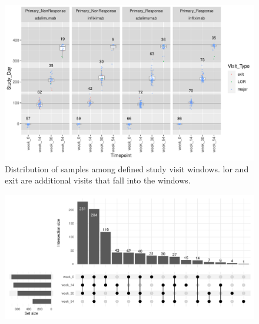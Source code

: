 \begin{outline}
\begin{figure}
    \centering
    \includegraphics[width=1.0\textwidth,page=1]{mainmatter/figures/chapter_04/process_pheno.pheno_filtered_dge.Study_Day_vs_Visit_Label.pdf}
    \caption{Distribution of samples among defined study visit windows. lor and exit are additional visits that fall into the windows.}
    \label{fig:multipants_studyDay_boxplots}
\end{figure}

\begin{figure}
    \centering
    \includegraphics[width=1.0\textwidth,page=1]{mainmatter/figures/chapter_04/process_pheno.pheno_filtered_dge.Visit_Label_upset.pdf}
    \caption{}
    \label{fig:multipants_visits_upset}
\end{figure}

%


\end{outline}
